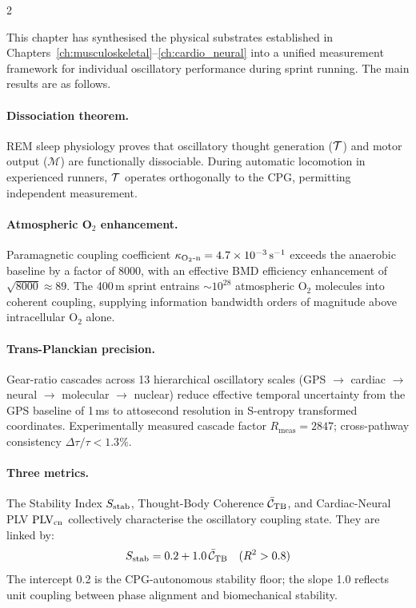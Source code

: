 \begin{multicols}{2}

This chapter has synthesised the physical substrates established in Chapters~\ref{ch:musculoskeletal}--\ref{ch:cardio_neural} into a unified measurement framework for individual oscillatory performance during sprint running. The main results are as follows.

\paragraph{Dissociation theorem.}
REM sleep physiology proves that oscillatory thought generation ($\mathcal{T}$) and motor output ($\mathcal{M}$) are functionally dissociable. During automatic locomotion in experienced runners, $\mathcal{T}$ operates orthogonally to the CPG, permitting independent measurement.

\paragraph{Atmospheric O$_2$ enhancement.}
Paramagnetic coupling coefficient $\kappa_{\mathrm{O_2\text{-}n}} = 4.7\times10^{-3}\,\mathrm{s}^{-1}$ exceeds the anaerobic baseline by a factor of 8000, with an effective BMD efficiency enhancement of $\sqrt{8000}\approx 89$. The 400\,m sprint entrains $\sim\!10^{28}$ atmospheric O$_2$ molecules into coherent coupling, supplying information bandwidth orders of magnitude above intracellular O$_2$ alone.

\paragraph{Trans-Planckian precision.}
Gear-ratio cascades across 13 hierarchical oscillatory scales (GPS $\to$ cardiac $\to$ neural $\to$ molecular $\to$ nuclear) reduce effective temporal uncertainty from the GPS baseline of 1\,ms to attosecond resolution in S-entropy transformed coordinates. Experimentally measured cascade factor $R_{\mathrm{meas}} = 2847$; cross-pathway consistency $\Delta\tau/\tau < 1.3\%$.

\paragraph{Three metrics.}
The Stability Index $S_{\mathrm{stab}}$, Thought-Body Coherence $\bar{\mathcal{C}}_{\mathrm{TB}}$, and Cardiac-Neural PLV $\mathrm{PLV}_{\mathrm{cn}}$ collectively characterise the oscillatory coupling state. They are linked by:
\begin{equation}
S_{\mathrm{stab}} = 0.2 + 1.0\,\bar{\mathcal{C}}_{\mathrm{TB}} \quad (R^2 > 0.8)
\end{equation}
The intercept 0.2 is the CPG-autonomous stability floor; the slope 1.0 reflects unit coupling between phase alignment and biomechanical stability.


\end{multicols}
